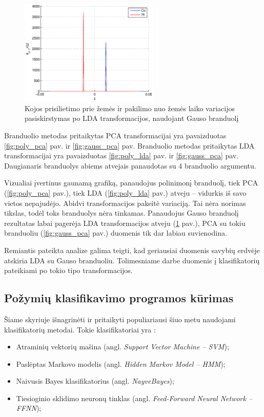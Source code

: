 \documentclass[]{vgtuef}
\begin{document}
\begin{figure}[!t]
  \centering
  \includegraphics[width=250px]{figures/st_sw_gauss_gda.eps}
  \caption{Kojos prisilietimo prie žemės ir pakilimo nuo žemės laiko variacijos pasiskirstymas po LDA transformacijos, naudojant Gauso branduolį}
  \label{fig:gauss_lda}
\end{figure}

Branduolio metodas pritaikytas PCA transformacijai yra pavaizduotas \ref{fig:poly_pca} pav. ir \ref{fig:gauss_pca} pav. Branduolio metodas pritaikytas LDA transformacijai yra pavaizduotas \ref{fig:poly_lda} pav. ir \ref{fig:gauss_pca} pav. Daugianaris branduolys abiems atvejais panaudotas su 4 branduolio argumentu.

Vizualiai įvertinus gaunamą grafiką, panaudojus polinimonį branduolį, tiek PCA (\ref{fig:poly_pca} pav.), tiek LDA (\ref{fig:poly_lda} pav.) atveju -- vidurkis iš savo vietos nepajudėjo. Abidvi transformacijos pakeitė variaciją. Tai nėra norimas tikslas, todėl toks branduolys nėra tinkamas. Panaudojus Gauso branduolį rezultatas labai pagerėja LDA transformacijos atveju (\ref{fig:gauss_lda} pav.), PCA su tokiu branduoliu (\ref{fig:gauss_pca} pav.) duomenis tik dar labiau suvienodina.

Remiantis pateikta analize galima teigti, kad geriausiai duomenis savybių erdvėje atskiria LDA su Gauso branduoliu. Tolimesniame darbe duomenis į klasifikatorių pateikiami po tokio tipo transformacijos.

\subsection{Požymių klasifikavimo programos kūrimas}

Šiame skyriuje išnagrinėti ir pritaikyti populiariausi šiuo metu naudojami klasifikatorių metodai. Tokie klasifikatoriai yra \cite{824819}:

\begin{itemize}
\item Atraminių vektorių mašina (angl. \textit{Support Vector Machine -- SVM});
\item Paslėptas Markovo modelis (angl. \textit{Hidden Markov Model -- HMM});
\item Naivusis Bayes klasifikatorius (angl. \textit{NayveBayes});
\item Tiesioginio sklidimo neuronų tinklas (angl. \textit{Feed-Forward Neural Network -- FFNN});
\end{itemize}
\end{document}
